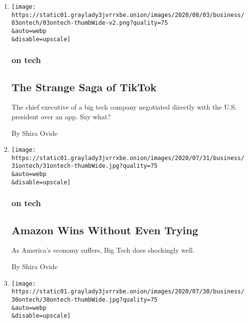 \begin{enumerate}
\def\labelenumi{\arabic{enumi}.}
\item
  \href{/2020/08/03/technology/tiktok-microsoft.html}{}

  \texttt{[image: https://static01.graylady3jvrrxbe.onion/images/2020/08/03/business/03ontech/03ontech-thumbWide-v2.png?quality=75\\\&auto=webp\\\&disable=upscale]}

  \hypertarget{on-tech}{%
  \subsubsection{on tech}\label{on-tech}}

  \hypertarget{the-strange-saga-of-tiktok}{%
  \subsection{The Strange Saga of
  TikTok}\label{the-strange-saga-of-tiktok}}

  The chief executive of a big tech company negotiated directly with the
  U.S. president over an app. Say what?

  By Shira Ovide
\item
  \href{/2020/07/31/technology/amazon-earnings.html}{}

  \texttt{[image: https://static01.graylady3jvrrxbe.onion/images/2020/07/31/business/31ontech/31ontech-thumbWide.jpg?quality=75\\\&auto=webp\\\&disable=upscale]}

  \hypertarget{on-tech-1}{%
  \subsubsection{on tech}\label{on-tech-1}}

  \hypertarget{amazon-wins-without-even-trying}{%
  \subsection{Amazon Wins Without Even
  Trying}\label{amazon-wins-without-even-trying}}

  As America's economy suffers, Big Tech does shockingly well.

  By Shira Ovide
\item
  \href{/2020/07/30/technology/big-tech-backlash.html}{}

  \texttt{[image: https://static01.graylady3jvrrxbe.onion/images/2020/07/30/business/30ontech/30ontech-thumbWide.jpg?quality=75\\\&auto=webp\\\&disable=upscale]}


\end{enumerate}
